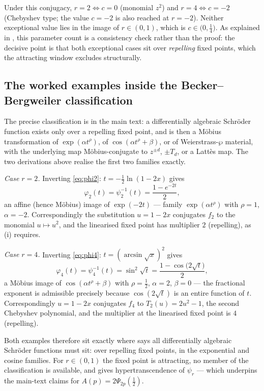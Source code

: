 \documentclass[11pt,a4paper]{article}
\theoremstyle{plain}
\theoremstyle{definition}
\begin{document}
Under this conjugacy, $r=2\Leftrightarrow c=0$ (monomial $z^2$) and $r=4\Leftrightarrow c=-2$ (Chebyshev type; the value $c=-2$ is also reached at $r=-2$). Neither exceptional value lies in the image of $r\in(0,1)$, which is $c\in\bigl(0,\tfrac14\bigr)$. As explained in , this parameter count is a consistency check rather than the proof: the decisive point is that both exceptional cases sit over \emph{repelling} fixed points, which the attracting window excludes structurally.

\subsection{The worked examples inside the Becker--Bergweiler classification}

The precise classification is  in the main text: a differentially algebraic Schr\"oder function exists only over a repelling fixed point, and is then a M\"obius transformation of $\exp(\alpha t^{\rho})$, of $\cos(\alpha t^{\rho}+\beta)$, or of Weierstrass-$\wp$ material, with the underlying map M\"obius-conjugate to $z^{\pm d}$, $\pm T_d$, or a Latt\`es map. The two derivations above realise the first two families exactly.

\emph{Case $r=2$.} Inverting \eqref{eq:phi2}: $t=-\tfrac12\ln(1-2x)$ gives
\[
\varphi_2(t)=\psi_2^{-1}(t)=\frac{1-e^{-2t}}{2},
\]
an affine (hence M\"obius) image of $\exp(-2t)$ --- family $\exp(\alpha t^{\rho})$ with $\rho=1$, $\alpha=-2$. Correspondingly the substitution $u=1-2x$ conjugates $f_2$ to the monomial $u\mapsto u^2$, and the linearised fixed point has multiplier $2$ (repelling), as (i) requires.

\emph{Case $r=4$.} Inverting \eqref{eq:phi4}: $t=(\arcsin\sqrt{x})^2$ gives
\[
\varphi_4(t)=\psi_4^{-1}(t)=\sin^2\!\sqrt{t}=\frac{1-\cos\bigl(2\sqrt{t}\bigr)}{2},
\]
a M\"obius image of $\cos(\alpha t^{\rho}+\beta)$ with $\rho=\tfrac12$, $\alpha=2$, $\beta=0$ --- the fractional exponent is admissible precisely because $\cos(2\sqrt{t})$ is an entire function of $t$. Correspondingly $u=1-2x$ conjugates $f_4$ to $T_2(u)=2u^2-1$, the second Chebyshev polynomial, and the multiplier at the linearised fixed point is $4$ (repelling).

Both examples therefore sit exactly where  says all differentially algebraic Schr\"oder functions must sit: over repelling fixed points, in the exponential and cosine families. For $r\in(0,1)$ the fixed point is attracting, no member of the classification is available, and  gives hypertranscendence of $\psi_r$ --- which underpins the main-text claims for $A(p)=2\Psi_{2p}(\tfrac12)$.
\end{document}
